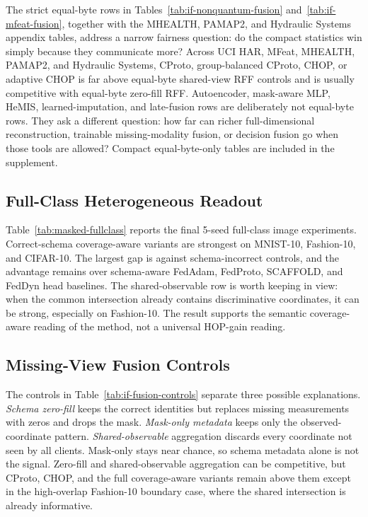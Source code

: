 The strict equal-byte rows in Tables~\ref{tab:if-nonquantum-fusion} and~\ref{tab:if-mfeat-fusion}, together with the MHEALTH, PAMAP2, and Hydraulic Systems appendix tables, address a narrow fairness question: do the compact statistics win simply because they communicate more? Across UCI HAR, MFeat, MHEALTH, PAMAP2, and Hydraulic Systems, CProto, group-balanced CProto, CHOP, or adaptive CHOP is far above equal-byte shared-view RFF controls and is usually competitive with equal-byte zero-fill RFF. Autoencoder, mask-aware MLP, HeMIS, learned-imputation, and late-fusion rows are deliberately not equal-byte rows. They ask a different question: how far can richer full-dimensional reconstruction, trainable missing-modality fusion, or decision fusion go when those tools are allowed? Compact equal-byte-only tables are included in the supplement.

\subsection{Full-Class Heterogeneous Readout}



Table~\ref{tab:masked-fullclass} reports the final 5-seed full-class image experiments. Correct-schema coverage-aware variants are strongest on MNIST-10, Fashion-10, and CIFAR-10. The largest gap is against schema-incorrect controls, and the advantage remains over schema-aware FedAdam, FedProto, SCAFFOLD, and FedDyn head baselines. The shared-observable row is worth keeping in view: when the common intersection already contains discriminative coordinates, it can be strong, especially on Fashion-10. The result supports the semantic coverage-aware reading of the method, not a universal HOP-gain reading.

\subsection{Missing-View Fusion Controls}



The controls in Table~\ref{tab:if-fusion-controls} separate three possible explanations. \emph{Schema zero-fill} keeps the correct identities but replaces missing measurements with zeros and drops the mask. \emph{Mask-only metadata} keeps only the observed-coordinate pattern. \emph{Shared-observable} aggregation discards every coordinate not seen by all clients. Mask-only stays near chance, so schema metadata alone is not the signal. Zero-fill and shared-observable aggregation can be competitive, but CProto, CHOP, and the full coverage-aware variants remain above them except in the high-overlap Fashion-10 boundary case, where the shared intersection is already informative.

